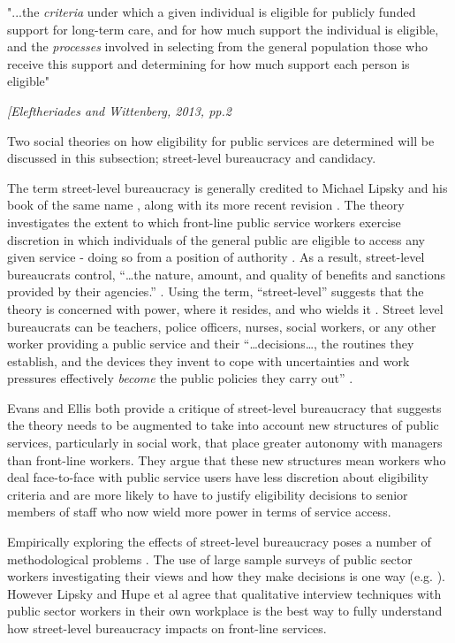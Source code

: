 \documentclass[12pt,]{report}
\begin{document}
\setlength{\epigraphwidth}{0.8\textwidth}
\epigraph{"...the \textit{criteria} under which a given individual is eligible for publicly funded support for long-term care, and for how much support the individual is eligible, and the \textit{processes} involved in selecting from the general population those who receive this support and determining for how much support each person is eligible"}{\textit{[Eleftheriades and Wittenberg, 2013, pp.2}}

Two social theories on how eligibility for public services are
determined will be discussed in this subsection; street-level
bureaucracy and candidacy.

The term street-level bureaucracy is generally credited to Michael
Lipsky and his book of the same name \citeyearpar{RN174}, along with its
more recent revision \citep{RN430}. The theory investigates the extent
to which front-line public service workers exercise discretion in which
individuals of the general public are eligible to access any given
service - doing so from a position of authority \citep{RN430}. As a
result, street-level bureaucrats control, ``\ldots{}the nature, amount,
and quality of benefits and sanctions provided by their agencies.''
\citep[pp.13]{RN430}. Using the term, ``street-level'' suggests that the
theory is concerned with power, where it resides, and who wields it
\citep{RN428}. Street level bureaucrats can be teachers, police
officers, nurses, social workers, or any other worker providing a public
service \citep{RN428} and their ``\ldots{}decisions\ldots{}, the
routines they establish, and the devices they invent to cope with
uncertainties and work pressures effectively \textit{become} the public
policies they carry out'' \citep[pp.xiii]{RN430}.

Evans\citeyearpar{RN424} and Ellis \citeyearpar{RN426} both provide a
critique of street-level bureaucracy that suggests the theory needs to
be augmented to take into account new structures of public services,
particularly in social work, that place greater autonomy with managers
than front-line workers. They argue that these new structures mean
workers who deal face-to-face with public service users have less
discretion about eligibility criteria and are more likely to have to
justify eligibility decisions to senior members of staff who now wield
more power in terms of service access.

Empirically exploring the effects of street-level bureaucracy poses a
number of methodological problems \citep{RN428}. The use of large sample
surveys of public sector workers investigating their views and how they
make decisions is one way (e.g. \citep{RN427}). However Lipsky
\citeyearpar{RN430} and Hupe et al \citeyearpar{RN428} agree that
qualitative interview techniques with public sector workers in their own
workplace is the best way to fully understand how street-level
bureaucracy impacts on front-line services.
\end{document}
